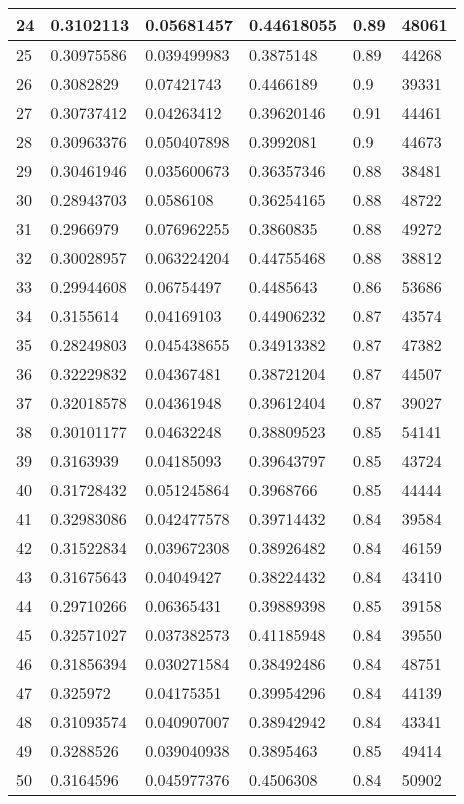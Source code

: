 \begin{longtable}{|l|l|l|l|l|l|}
24 & 0.3102113 & 0.05681457 & 0.44618055 & 0.89 & 48061 \\ \hline 
25 & 0.30975586 & 0.039499983 & 0.3875148 & 0.89 & 44268 \\ \hline 
26 & 0.3082829 & 0.07421743 & 0.4466189 & 0.9 & 39331 \\ \hline 
27 & 0.30737412 & 0.04263412 & 0.39620146 & 0.91 & 44461 \\ \hline 
28 & 0.30963376 & 0.050407898 & 0.3992081 & 0.9 & 44673 \\ \hline 
29 & 0.30461946 & 0.035600673 & 0.36357346 & 0.88 & 38481 \\ \hline 
30 & 0.28943703 & 0.0586108 & 0.36254165 & 0.88 & 48722 \\ \hline 
31 & 0.2966979 & 0.076962255 & 0.3860835 & 0.88 & 49272 \\ \hline 
32 & 0.30028957 & 0.063224204 & 0.44755468 & 0.88 & 38812 \\ \hline 
33 & 0.29944608 & 0.06754497 & 0.4485643 & 0.86 & 53686 \\ \hline 
34 & 0.3155614 & 0.04169103 & 0.44906232 & 0.87 & 43574 \\ \hline 
35 & 0.28249803 & 0.045438655 & 0.34913382 & 0.87 & 47382 \\ \hline 
36 & 0.32229832 & 0.04367481 & 0.38721204 & 0.87 & 44507 \\ \hline 
37 & 0.32018578 & 0.04361948 & 0.39612404 & 0.87 & 39027 \\ \hline 
38 & 0.30101177 & 0.04632248 & 0.38809523 & 0.85 & 54141 \\ \hline 
39 & 0.3163939 & 0.04185093 & 0.39643797 & 0.85 & 43724 \\ \hline 
40 & 0.31728432 & 0.051245864 & 0.3968766 & 0.85 & 44444 \\ \hline 
41 & 0.32983086 & 0.042477578 & 0.39714432 & 0.84 & 39584 \\ \hline 
42 & 0.31522834 & 0.039672308 & 0.38926482 & 0.84 & 46159 \\ \hline 
43 & 0.31675643 & 0.04049427 & 0.38224432 & 0.84 & 43410 \\ \hline 
44 & 0.29710266 & 0.06365431 & 0.39889398 & 0.85 & 39158 \\ \hline 
45 & 0.32571027 & 0.037382573 & 0.41185948 & 0.84 & 39550 \\ \hline 
46 & 0.31856394 & 0.030271584 & 0.38492486 & 0.84 & 48751 \\ \hline 
47 & 0.325972 & 0.04175351 & 0.39954296 & 0.84 & 44139 \\ \hline 
48 & 0.31093574 & 0.040907007 & 0.38942942 & 0.84 & 43341 \\ \hline 
49 & 0.3288526 & 0.039040938 & 0.3895463 & 0.85 & 49414 \\ \hline 
50 & 0.3164596 & 0.045977376 & 0.4506308 & 0.84 & 50902 \\ \hline 
\end{longtable}